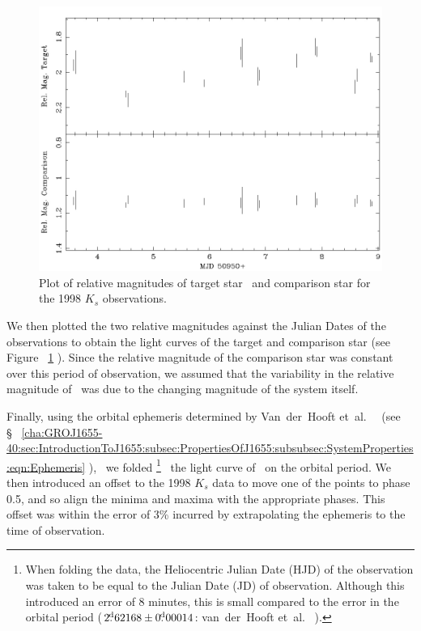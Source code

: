 \begin{figure}[!htb]
\begin{center}
\includegraphics[width=5.0in]{kctio98prefolded}
\caption{%
Plot of relative magnitudes of target star \groj\ and comparison star
for the 1998 $K_s$ observations. %
}
\label{cha:lightcurve:sec:Photometry:subsec:RelativePhotometry:fig:kctio98prefolded}
\end{center}
\end{figure}

\vspace{\myparskip}

We then plotted the two relative magnitudes against the Julian
Dates of the observations to obtain the light curves of the target and
comparison star (see Figure~%
\ref{cha:lightcurve:sec:Photometry:subsec:RelativePhotometry:fig:kctio98prefolded}%
). Since the relative magnitude of the comparison star was constant over this period of observation, we assumed that the variability in the relative magnitude of \groj\ was due to the changing magnitude of the system itself. %

\vspace{\myparskip}

Finally, using the orbital
ephemeris determined by Van~der~Hooft et~al.\ %
\citeyear{VanDerHooft_et_al.:1998}%
\ (see \S~%
\vref{cha:GROJ1655-40:sec:IntroductionToJ1655:subsec:PropertiesOfJ1655:subsubsec:SystemProperties:eqn:Ephemeris}%
),%
\ we folded%
\footnote{%
\label{cha:lightcurve:sec:Photometry:subsec:RelativePhotometry:foot:MJD}%
When folding the data, the Heliocentric Julian Date (HJD) of the
observation was taken to be equal to the Julian Date (JD) of
observation. Although this introduced an error of 8 minutes, this is
small compared to the error in the orbital period ($2\hbox{$.\!\!^{\rm d}$}62168\pm0\hbox{$.\!\!^{\rm d}$}00014$:
van~der~Hooft et~al.\ %
%
).}%
\ the light curve of \groj\ on the orbital period. We then introduced
an offset to the 1998 $K_s$ data to move one of the points to phase
0.5, and so align the minima and maxima with the appropriate
phases. This offset was within the error of 3\% incurred by
extrapolating the ephemeris to the time of observation. %

